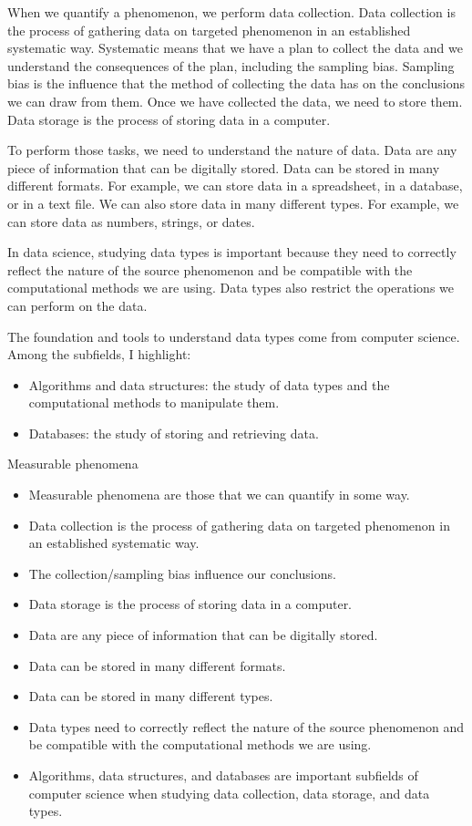When we quantify a phenomenon, we perform data collection.  Data collection is the process
of gathering data on targeted phenomenon in an established systematic way.
Systematic means that we have a plan to collect the data and we understand the
consequences of the plan, including the sampling bias.  Sampling bias is the influence
that the method of collecting the data has on the conclusions we can draw from them.
Once we have collected the data, we need to store them.  Data storage is the process of
storing data in a computer.

To perform those tasks, we need to understand the nature of data.  Data are any piece of
information that can be digitally stored.  Data can be stored in many different formats.
For example, we can store data in a spreadsheet, in a database, or in a text file.  We can
also store data in many different types.  For example, we can store data as numbers,
strings, or dates.

In data science, studying data types is important because they need to correctly reflect
the nature of the source phenomenon and be compatible with the computational methods we
are using.  Data types also restrict the operations we can perform on the data.

The foundation and tools to understand data types come from computer science.  Among the
subfields, I highlight:
\begin{itemize}
  \item Algorithms and data structures: the study of data types and the computational
    methods to manipulate them.
  \item Databases: the study of storing and retrieving data.
\end{itemize}

\begin{slidebox}{Measurable phenomena}{}
  \begin{itemize}
    \item Measurable phenomena are those that we can quantify in some way.
    \item Data collection is the process of gathering data on targeted phenomenon in an
      established systematic way.
    \item The collection/sampling bias influence our conclusions.
    \item Data storage is the process of storing data in a computer.
    \item Data are any piece of information that can be digitally stored.
    \item Data can be stored in many different formats.
    \item Data can be stored in many different types.
    \item Data types need to correctly reflect the nature of the source phenomenon and be
      compatible with the computational methods we are using.
    \item Algorithms, data structures, and databases are important subfields of computer
      science when studying data collection, data storage, and data types.
  \end{itemize}
\end{slidebox}

